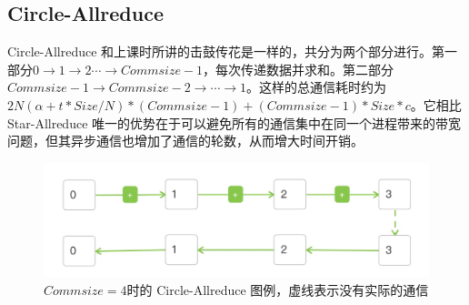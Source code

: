 \documentclass{article}
\begin{document}
\subsection{Circle-Allreduce}
Circle-Allreduce 和上课时所讲的击鼓传花是一样的，共分为两个部分进行。第一部分$0\rightarrow1\rightarrow2\cdots\rightarrow Commsize-1$，每次传递数据并求和。第二部分$Commsize-1\rightarrow Commsize-2\rightarrow\cdots\rightarrow1$。这样的总通信耗时约为 $2N(\alpha+t*Size/N)*(Commsize-1)+(Commsize-1)*Size*c$。它相比 Star-Allreduce 唯一的优势在于可以避免所有的通信集中在同一个进程带来的带宽问题，但其异步通信也增加了通信的轮数，从而增大时间开销。
\begin{figure}[H]
	\centering
	\includegraphics[width=0.6\linewidth]{./fig/circle}
\caption{$Commsize = 4$时的 Circle-Allreduce 图例，虚线表示没有实际的通信\label{fig:circle}}
\end{figure}
\end{document}
